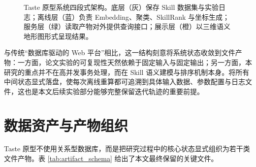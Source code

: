 \begin{figure}[htbp]
\caption{Taste 原型系统四段式架构。底层（灰）保存 Skill 数据集与实验日志；离线层（蓝）负责 Embedding、聚类、SkillRank 与坐标生成；服务层（绿）读取产物对外提供查询接口；展示层（橙）以三维语义地形图形式呈现结果。}
\label{fig:system_arch}
\end{figure}

与传统“数据库驱动的 Web 平台”相比，这一结构刻意将系统状态收敛到文件产物：一方面，论文实验的可复现性天然依赖于固定输入与固定输出；另一方面，本研究的重点并不在高并发事务处理，而在 Skill 语义建模与排序机制本身。将所有中间状态显式落盘，使每次离线重算都可追溯到具体输入数据、参数配置与日志文件，这也是本文后续实验部分能够完整保留迭代轨迹的重要前提。

\section{数据资产与产物组织}
\label{sec:data_module}

Taste 原型不使用关系型数据库，而是把研究过程中的核心状态显式组织为若干类文件产物。表 \ref{tab:artifact_schema} 给出了本文最终保留的关键文件。

